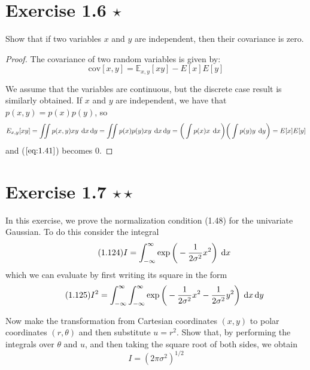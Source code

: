 \section*{Exercise 1.6 $\star$}
Show that if two variables $x$ and $y$ are independent, then their covariance is zero.

\vspace{1em}

\begin{proof}
    The covariance of two random variables is given by:
    \begin{equation}\label{eq:1.41}\tag{1.41}
        \text{cov}[x, y] = \mathbb{E}_{x, y} [xy] - E[x]E[y]
    \end{equation}

    We assume that the variables are continuous, but the discrete case result is similarly obtained.
    If $x$ and $y$ are independent, we have that $p(x, y) = p(x)p(y)$, so
     \[
         E_{x, y}[xy] = \iint p(x, y) xy \hspace{0.25em} \mathop{}\!\mathrm{d} x \mathop{}\!\mathrm{d} y 
         = \iint p(x) p(y) xy \hspace{0.25em} \mathop{}\!\mathrm{d} x \mathop{}\!\mathrm{d} y
         = \bigg(\int p(x) x \hspace{0.25em} \mathop{}\!\mathrm{d} x\bigg) \bigg(\int p(y) y \hspace{0.25em} \mathop{}\!\mathrm{d} y\bigg)
         = E[x]E[y]
    \] 
    and ($\ref{eq:1.41}$) becomes 0.
\end{proof}

\section*{Exercise 1.7 $\star \star$}
In this exercise, we prove the normalization condition (1.48) for the univariate
Gaussian. To do this consider the integral
\begin{equation}\label{eq:1.124}\tag{1.124}
    I = \int_{-\infty}^{\infty} \exp\bigg(-\frac{1}{2\sigma^2}x^2\bigg) \hspace{0.25em} \mathop{}\!\mathrm{d} x
\end{equation}
which we can evaluate by first writing its square in the form
\begin{equation}\label{eq:1.125}\tag{1.125}
    I^2 = \int_{-\infty}^{\infty} \int_{-\infty}^{\infty} \exp 
        \bigg(-\frac{1}{2\sigma^2}x^2 - \frac{1}{2\sigma^2}y^2\bigg) \hspace{0.25em} \mathop{}\!\mathrm{d} x\mathop{}\!\mathrm{d} y
\end{equation}

Now make the transformation from Cartesian coordinates $(x, y)$ to polar coordinates $(r, \theta)$ 
and then substitute $u = r^2$. Show that, by performing the integrals over $\theta$ and $u$,
and then taking the square root of both sides, we obtain
\begin{equation}\label{eq:1.126}\tag{1.126}
    I = (2\pi\sigma^2)^{1/2}
\end{equation}

